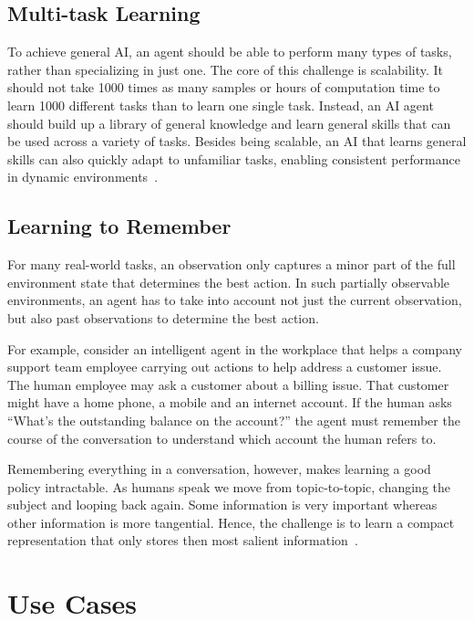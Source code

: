 \documentclass[letterpaper, 10 pt]{IEEEconf}
\begin{document}
\subsection{Multi-task Learning}

To achieve general AI, an agent should be able to perform many types
of tasks, rather than specializing in just one. The core of this
challenge is scalability. It should not take 1000 times as many
samples or hours of computation time to learn 1000 different tasks
than to learn one single task. Instead, an AI agent should build up a
library of general knowledge and learn general skills that can be used
across a variety of tasks. Besides being scalable, an AI that learns
general skills can also quickly adapt to unfamiliar tasks, enabling
consistent performance in dynamic
environments~\cite{microsoft_research_2018}.

\subsection{Learning to Remember}

For many real-world tasks, an observation only captures a minor part
of the full environment state that determines the best action. In such
partially observable environments, an agent has to take into account
not just the current observation, but also past observations to
determine the best action.

For example, consider an intelligent agent in the workplace that helps
a company support team employee carrying out actions to help address a
customer issue. The human employee may ask a customer about a billing
issue. That customer might have a home phone, a mobile and an internet
account. If the human asks “What’s the outstanding balance on the
account?” the agent must remember the course of the conversation to
understand which account the human refers to.

Remembering everything in a conversation, however, makes learning a
good policy intractable. As humans speak we move from topic-to-topic,
changing the subject and looping back again. Some information is very
important whereas other information is more tangential. Hence, the
challenge is to learn a compact representation that only stores then
most salient information~\cite{microsoft_research_2018}.

\section{Use Cases}
\end{document}
